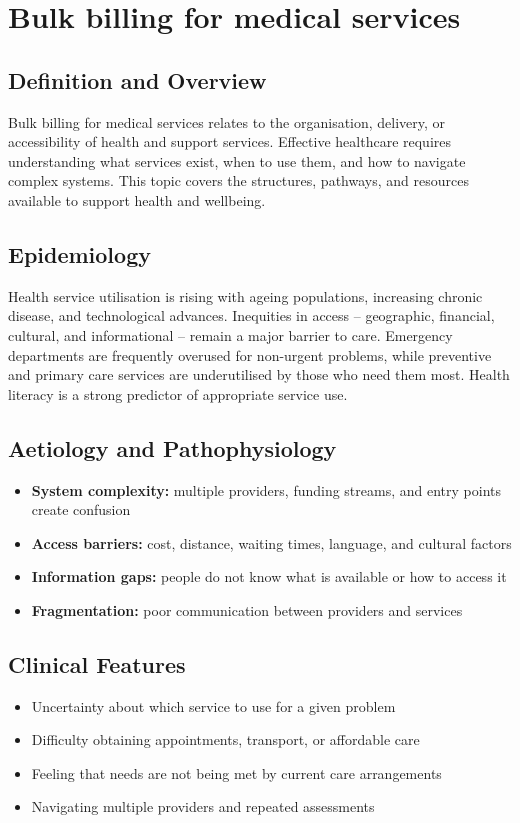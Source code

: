 \chapter{Bulk billing for medical services}

\section*{Definition and Overview}
Bulk billing for medical services relates to the organisation, delivery, or accessibility of health and support services. Effective healthcare requires understanding what services exist, when to use them, and how to navigate complex systems. This topic covers the structures, pathways, and resources available to support health and wellbeing.

\section*{Epidemiology}
Health service utilisation is rising with ageing populations, increasing chronic disease, and technological advances. Inequities in access -- geographic, financial, cultural, and informational -- remain a major barrier to care. Emergency departments are frequently overused for non-urgent problems, while preventive and primary care services are underutilised by those who need them most. Health literacy is a strong predictor of appropriate service use.

\section*{Aetiology and Pathophysiology}
\begin{itemize}
    \item \textbf{System complexity:} multiple providers, funding streams, and entry points create confusion
    \item \textbf{Access barriers:} cost, distance, waiting times, language, and cultural factors
    \item \textbf{Information gaps:} people do not know what is available or how to access it
    \item \textbf{Fragmentation:} poor communication between providers and services
\end{itemize}

\section*{Clinical Features}
\begin{itemize}
    \item Uncertainty about which service to use for a given problem
    \item Difficulty obtaining appointments, transport, or affordable care
    \item Feeling that needs are not being met by current care arrangements
    \item Navigating multiple providers and repeated assessments
\end{itemize}

